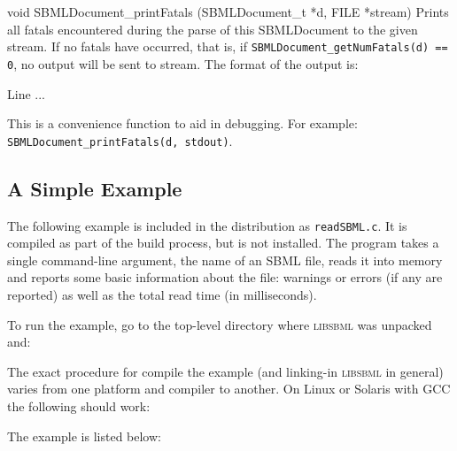 \documentclass{cekmanual}
\begin{document}
\begin{methoddef}{void SBMLDocument\_printFatals (SBMLDocument\_t *d,
FILE *stream)}
  Prints all fatals encountered during the parse of this SBMLDocument
  to the given stream.  If no fatals have occurred, that is, if
  \texttt{SBMLDocument\_getNumFatals(d) == 0}, no output will be sent
  to stream. The format of the output is:
  \begin{example}
      Line %
      ...
  \end{example}
  This is a convenience function to aid in debugging.  For example:\\
  \texttt{SBMLDocument\_printFatals(d, stdout)}.
 \end{methoddef}


\subsection{A Simple Example}
\label{sec:read-example}

The following example is included in the distribution as
\texttt{readSBML.c}.  It is compiled as part of the build process, but
is not installed.  The program takes a single command-line argument,
the name of an SBML file, reads it into memory and reports some basic
information about the file: warnings or errors (if any are reported)
as well as the total read time (in milliseconds).

To run the example, go to the top-level directory where
\textsc{libsbml} was unpacked and:

\begin{example}[csh]
\end{example}


The exact procedure for compile the example (and linking-in
\textsc{libsbml} in general) varies from one platform and compiler to
another.  On Linux or Solaris with GCC the following should work:

\begin{example}[csh]
\end{example}


The example is listed below:
\end{document}

